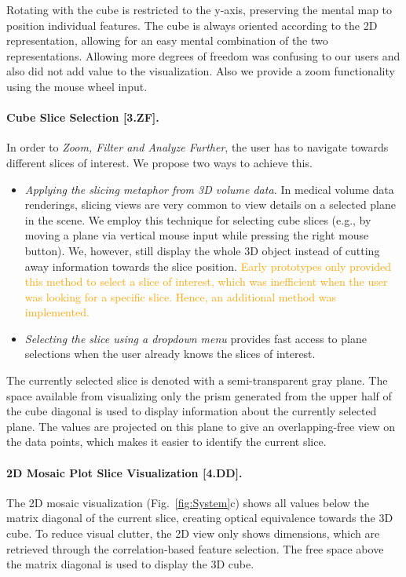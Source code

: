 \documentclass[journal]{style/vgtc} 			          %
\newcommand{\design}[1]{\textcolor{orange}{#1}}
\begin{document}
Rotating with the cube is restricted to the y-axis, preserving the mental map to position individual features.
The cube is always oriented according to the 2D representation, allowing for an easy mental combination of the two representations.
Allowing more degrees of freedom was confusing to our users and also did not add value to the visualization.
Also we provide a zoom functionality using the mouse wheel input.
\paragraph{Cube Slice Selection [3.ZF].}
In order to \emph{Zoom, Filter and Analyze Further}, the user has to navigate towards different slices of interest.
We propose two ways to achieve this.
\begin{itemize}
	\item \emph{Applying the slicing metaphor from 3D volume data.}
	In medical volume data renderings, slicing views are very common to view details on a selected plane in the scene.
	We employ this technique for selecting cube slices (e.g., by moving a plane via vertical mouse input while pressing the right mouse button).
	We, however, still display the whole 3D object instead of cutting away information towards the slice position.
	\design{Early prototypes only provided this method to select a slice of interest, which was inefficient when the user was looking for a specific slice.
	Hence, an additional method was implemented.
	}
	\item \emph{Selecting the slice using a dropdown menu} provides fast access to plane selections when the user already knows the slices of interest.
\end{itemize}
The currently selected slice is denoted with a semi-transparent gray plane.
The space available from visualizing only the prism generated from the upper half of the cube diagonal is used to display information about the currently selected plane.
The values are projected on this plane to give an overlapping-free view on the data points, which makes it easier to identify the current slice.
\paragraph{2D Mosaic Plot Slice Visualization [4.DD].}
The 2D mosaic visualization (Fig.~\ref{fig:System}c) shows all values below the matrix diagonal of the current slice, creating optical equivalence towards the 3D cube.
To reduce visual clutter, the 2D view only shows dimensions, which are retrieved through the correlation-based feature selection.
The free space above the matrix diagonal is used to display the 3D cube.
\end{document}
